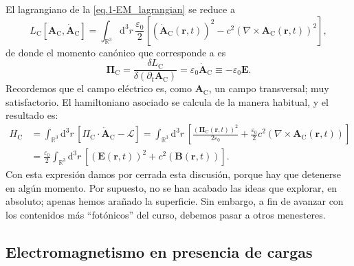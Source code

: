 El lagrangiano de la \cref{eq.1-EM_lagrangian} se reduce a 
\begin{equation}
    \label{eq.1-EM_lagrangian_Coulomb}
    L_\mathrm{C}[\mathbf{A}_\mathrm{C}, \dot{\mathbf{A}}_\mathrm{C}] = 
    \int_{\mathbb{R}^3}\mathrm{d}^3r\, \frac{\varepsilon_0}{2} \left[\left(\dot{\mathbf{A}}_\mathrm{C}(\mathbf{r}, t)\right)^2 - c^2 (\nabla\times\mathbf{A}_\mathrm{C}(\mathbf{r}, t))^2\right],
\end{equation}
de donde el momento canónico que corresponde a  es
\begin{equation}
    \boldsymbol{\Pi}_\mathrm{C} = \frac{\delta L_\mathrm{C}}{\delta (\partial_t \mathbf{A}_\mathrm{C})} = \varepsilon_0 \dot{\mathbf{A}}_\mathrm{C} \equiv -\varepsilon_0 \mathbf{E}.
\end{equation}
Recordemos que el campo eléctrico es, como \(\mathbf{A}_\mathrm{C}\), un campo transversal; muy satisfactorio. El hamiltoniano asociado se calcula de la manera habitual, y el resultado es:
\begin{align}
    \nonumber
    H_\mathrm{C} &= \int_{\mathbb{R}^3}\mathrm{d}^3r\, \left[\Pi_\mathrm{C}\cdot\dot{\mathbf{A}}_\mathrm{C} - \mathcal{L}\right] = \int_{\mathbb{R}^3}\mathrm{d}^3r\, \left[\frac{\left(\boldsymbol{\Pi}_\mathrm{C}(\mathbf{r}, t)\right)^2}{2\varepsilon_0} + \frac{\varepsilon_0}{2}c^2 \left(\nabla\times\mathbf{A}_\mathrm{C}(\mathbf{r}, t)\right)\right] \\
    & = \frac{\varepsilon_0}{2}\int_{\mathbb{R}^3}\mathrm{d}^3r\, \left[\left(\mathbf{E}(\mathbf{r}, t)\right)^2 + c^2 \left(\mathbf{B}(\mathbf{r}, t)\right)\right].
\end{align}
Con esta expresión damos por cerrada esta discusión, porque hay que detenerse en algún momento. Por supuesto, no se han acabado las ideas que explorar, en absoluto; apenas hemos arañado la superficie. Sin embargo, a fin de avanzar con los contenidos más ``fotónicos'' del curso, debemos pasar a otros menesteres.

\subsection{Electromagnetismo en presencia de cargas}
\label{subsec.1-cargas}

